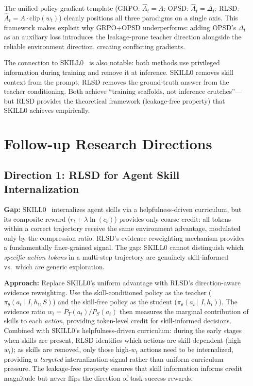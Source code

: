 \documentclass[11pt]{article}
\begin{document}
The unified policy gradient template (GRPO: $\hat{A}_t = A$; OPSD: $\hat{A}_t = \Delta_t$; RLSD: $\hat{A}_t = A \cdot \mathrm{clip}(w_t)$) cleanly positions all three paradigms on a single axis. This framework makes explicit why GRPO+OPSD underperforms: adding OPSD's $\Delta_t$ as an auxiliary loss introduces the leakage-prone teacher direction alongside the reliable environment direction, creating conflicting gradients.

The connection to SKILL0~\cite{skill0} is also notable: both methods use privileged information during training and remove it at inference. SKILL0 removes skill context from the prompt; RLSD removes the ground-truth answer from the teacher conditioning. Both achieve ``training scaffolds, not inference crutches''---but RLSD provides the theoretical framework (leakage-free property) that SKILL0 achieves empirically.

\section{Follow-up Research Directions}

\subsection{Direction 1: RLSD for Agent Skill Internalization}

\textbf{Gap:} SKILL0~\cite{skill0} internalizes agent skills via a helpfulness-driven curriculum, but its composite reward ($r_t + \lambda \ln(c_t)$) provides only coarse credit: all tokens within a correct trajectory receive the same environment advantage, modulated only by the compression ratio. RLSD's evidence reweighting mechanism provides a fundamentally finer-grained signal. The gap: SKILL0 cannot distinguish which \textit{specific action tokens} in a multi-step trajectory are genuinely skill-informed vs.\ which are generic exploration.

\textbf{Approach:} Replace SKILL0's uniform advantage with RLSD's direction-aware evidence reweighting. Use the skill-conditioned policy as the teacher ($\pi_\theta(a_t \mid I, h_t, S)$) and the skill-free policy as the student ($\pi_\theta(a_t \mid I, h_t)$). The evidence ratio $w_t = P_T(a_t)/P_S(a_t)$ then measures the marginal contribution of skills to each \textit{action}, providing token-level credit for skill-informed decisions. Combined with SKILL0's helpfulness-driven curriculum: during the early stages when skills are present, RLSD identifies which actions are skill-dependent (high $w_t$); as skills are removed, only those high-$w_t$ actions need to be internalized, providing a \textit{targeted} internalization signal rather than uniform curriculum pressure. The leakage-free property ensures that skill information informs credit magnitude but never flips the direction of task-success rewards.
\end{document}
